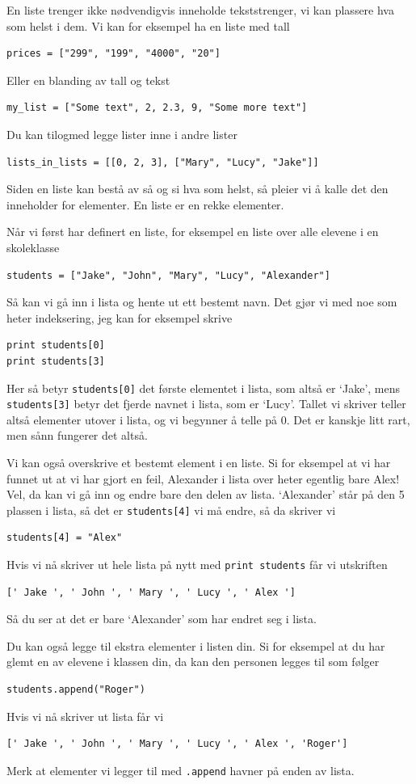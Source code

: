 \documentclass[a4paper, 11pt, notitlepage]{article}
\begin{document}
En liste trenger ikke nødvendigvis inneholde tekststrenger, vi kan plassere hva som helst i dem. Vi kan for eksempel ha en liste med tall
\begin{lstlisting}
prices = ["299", "199", "4000", "20"]
\end{lstlisting}
Eller en blanding av tall og tekst
\begin{lstlisting}
my_list = ["Some text", 2, 2.3, 9, "Some more text"]
\end{lstlisting}
Du kan tilogmed legge lister inne i andre lister
\begin{lstlisting}
lists_in_lists = [[0, 2, 3], ["Mary", "Lucy", "Jake"]]
\end{lstlisting}
Siden en liste kan bestå av så og si hva som helst, så pleier vi å kalle det den inneholder for elementer. En liste er en rekke elementer.

Når vi først har definert en liste, for eksempel en liste over alle elevene i en skoleklasse
\begin{lstlisting}
students = ["Jake", "John", "Mary", "Lucy", "Alexander"]
\end{lstlisting}
Så kan vi gå inn i lista og hente ut ett bestemt navn. Det gjør vi med noe som heter indeksering, jeg kan for eksempel skrive
\begin{lstlisting}
print students[0]
print students[3]
\end{lstlisting}
Her så betyr \verb+students[0]+ det første elementet i lista, som altså er `Jake', mens \verb+students[3]+ betyr det fjerde navnet i lista, som er `Lucy'. Tallet vi skriver teller altså elementer utover i lista, og vi begynner å telle på 0. Det er kanskje litt rart, men sånn fungerer det altså.

Vi kan også overskrive et bestemt element i en liste. Si for eksempel at vi har funnet ut at vi har gjort en feil, Alexander i lista over heter egentlig bare Alex! Vel, da kan vi gå inn og endre bare den delen av lista. `Alexander' står på den 5 plassen i lista, så det er \verb+students[4]+ vi må endre, så da skriver vi
\begin{lstlisting}
students[4] = "Alex"
\end{lstlisting}
Hvis vi nå skriver ut hele lista på nytt med \verb+print students+ får vi utskriften
\begin{verbatim}
[' Jake ', ' John ', ' Mary ', ' Lucy ', ' Alex ']
\end{verbatim}
Så du ser at det er bare `Alexander' som har endret seg i lista.

Du kan også legge til ekstra elementer i listen din. Si for eksempel at du har glemt en av elevene i klassen din, da kan den personen legges til som følger
\begin{lstlisting}
students.append("Roger")
\end{lstlisting}
Hvis vi nå skriver ut lista får vi
\begin{verbatim}
[' Jake ', ' John ', ' Mary ', ' Lucy ', ' Alex ', 'Roger']
\end{verbatim}
Merk at elementer vi legger til med \verb+.append+ havner på enden av lista.
\end{document}
